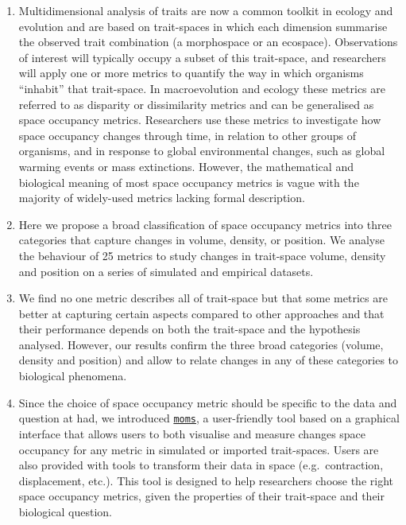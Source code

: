 \documentclass[]{article}
\begin{document}
\begin{enumerate}
\def\labelenumi{\arabic{enumi}.}
\item
  Multidimensional analysis of traits are now a common toolkit in
  ecology and evolution and are based on trait-spaces in which each
  dimension summarise the observed trait combination (a morphospace or
  an ecospace). Observations of interest will typically occupy a subset
  of this trait-space, and researchers will apply one or more metrics to
  quantify the way in which organisms ``inhabit'' that trait-space. In
  macroevolution and ecology these metrics are referred to as disparity
  or dissimilarity metrics and can be generalised as space occupancy
  metrics. Researchers use these metrics to investigate how space
  occupancy changes through time, in relation to other groups of
  organisms, and in response to global environmental changes, such as
  global warming events or mass extinctions. However, the mathematical
  and biological meaning of most space occupancy metrics is vague with
  the majority of widely-used metrics lacking formal description.
\item
  Here we propose a broad classification of space occupancy metrics into
  three categories that capture changes in volume, density, or position.
  We analyse the behaviour of 25 metrics to study changes in trait-space
  volume, density and position on a series of simulated and empirical
  datasets.
\item
  We find no one metric describes all of trait-space but that some
  metrics are better at capturing certain aspects compared to other
  approaches and that their performance depends on both the trait-space
  and the hypothesis analysed. However, our results confirm the three
  broad categories (volume, density and position) and allow to relate
  changes in any of these categories to biological phenomena.
\item
  Since the choice of space occupancy metric should be specific to the
  data and question at had, we introduced
  \href{https://tguillerme.shinyapps.io/moms/}{\texttt{moms}}, a
  user-friendly tool based on a graphical interface that allows users to
  both visualise and measure changes space occupancy for any metric in
  simulated or imported trait-spaces. Users are also provided with tools
  to transform their data in space (e.g.~contraction, displacement,
  etc.). This tool is designed to help researchers choose the right
  space occupancy metrics, given the properties of their trait-space and
  their biological question.
\end{enumerate}
\end{document}
